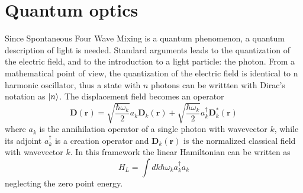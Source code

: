 \documentclass[12pt]{book}
\renewcommand{\r}{\mathbf{r}}
\begin{document}

\section{Quantum optics}
Since Spontaneous Four Wave Mixing is a quantum phenomenon, a quantum description of light is needed. Standard arguments \cite{book:cohen} leads to the quantization of the electric field, and to the introduction to a light particle: the photon. From a mathematical point of view, the quantization of the electric field is identical to n harmonic oscillator, thus a state with $n$ photons can be writtten with Dirac's notation as $\Ket{n}$. The displacement field becomes an operator
\begin{equation}
\mathbf{D}(\r) = \sqrt{\frac{\hbar \omega_k}{2}}a_k \mathbf{D}_k(\r) + \sqrt{\frac{\hbar \omega_k}{2}}a_k^\dagger \mathbf{D}^*_k(\r)
\end{equation}
where $a_k$ is the annihilation operator of a single photon with wavevector $k$, while its adjoint $a_k^\dagger$ is a creation operator and  $\mathbf{D}_k(\r)$ is the normalized classical field with wavevector $k$. In this framework the linear Hamiltonian can be written as
\begin{equation}H_L = \int dk \hbar \omega_k a_k^\dagger a_k  \end{equation}
neglecting the zero point energy. 
\end{document}
